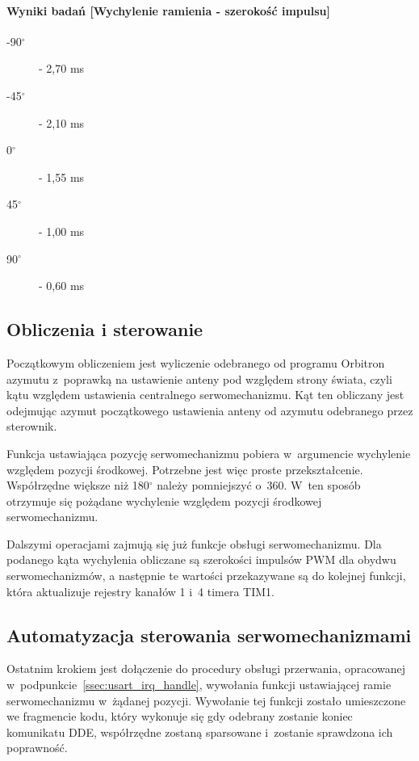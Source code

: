 \documentclass[eng,oneside]{mgr}
\begin{document}
			\paragraph{Wyniki badań [Wychylenie ramienia - szerokość impulsu]}
			\begin{description}
			\item[-90$^{\circ}$] - 2,70 ms
			\item[-45$^{\circ}$] - 2,10 ms
			\item[0$^{\circ}$] - 1,55 ms
			\item[45$^{\circ}$] - 1,00 ms
			\item[90$^{\circ}$] - 0,60 ms
			\end{description}

			\subsection{Obliczenia i sterowanie}
			Początkowym obliczeniem jest wyliczenie odebranego od programu Orbitron azymutu z~poprawką na ustawienie anteny pod względem strony świata, czyli kątu względem ustawienia centralnego serwomechanizmu. Kąt ten obliczany jest odejmując azymut początkowego ustawienia anteny od azymutu odebranego przez sterownik.
			
			Funkcja ustawiająca pozycję serwomechanizmu pobiera w~argumencie wychylenie względem pozycji środkowej. Potrzebne jest więc proste przekształcenie. Współrzędne większe niż 180$^{\circ}$ należy pomniejszyć o~360. W~ten sposób otrzymuje się pożądane wychylenie względem pozycji środkowej serwomechanizmu.

			Dalszymi operacjami zajmują się już funkcje obsługi serwomechanizmu. Dla podanego kąta wychylenia obliczane są szerokości impulsów PWM dla obydwu serwomechanizmów, a następnie te wartości przekazywane są do kolejnej funkcji, która aktualizuje rejestry kanałów 1 i~4 timera TIM1.

			\subsection{Automatyzacja sterowania serwomechanizmami}
			Ostatnim krokiem jest dołączenie do procedury obsługi przerwania, opracowanej w~podpunkcie~\ref{ssec:usart_irq_handle}, wywołania funkcji ustawiającej ramie serwomechanizmu w~żądanej pozycji. Wywołanie tej funkcji zostało umieszczone we fragmencie kodu, który wykonuje się gdy odebrany zostanie koniec komunikatu DDE, współrzędne zostaną sparsowane i~zostanie sprawdzona ich poprawność.
\end{document}
